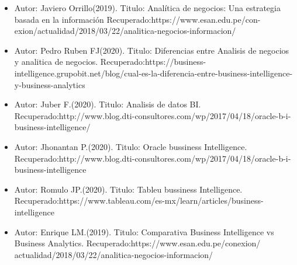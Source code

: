 \documentclass[twoside,twocolumn]{article}
\begin{document}
\begin{itemize}
\item Autor: Javiero Orrillo(2019).
\newline
\newline
Titulo: Analítica de negocios: Una estrategia basada en la información
\newline
\newline
Recuperado:https://www.esan.edu.pe/con-
exion/actualidad/2018/03/22/analitica-negocios-informacion/
\newline
\item Autor: Pedro Ruben FJ(2020).
\newline
\newline
Titulo: Diferencias entre Analisis de negocios y analitica de negocios.
\newline
\newline
Recuperado:https://business-intelligence.grupobit.net/blog/cual-es-la-diferencia-entre-business-intelligence-y-business-analytics


\item Autor: Juber F.(2020).
\newline
\newline
Titulo: Analisis de datos BI.
\newline
\newline
Recuperado:http://www.blog.dti-consultores.com/wp/2017/04/18/oracle-b-i-business-intelligence/

\item Autor: Jhonantan P.(2020).
\newline
\newline
Titulo: Oracle bussiness Intelligence.
\newline
\newline
Recuperado:http://www.blog.dti-consultores.com/wp/2017/04/18/oracle-b-i-business-intelligence

\item Autor: Romulo JP.(2020).
\newline
\newline
Titulo: Tableu bussiness Intelligence.
\newline
\newline
Recuperado:https://www.tableau.com/es-mx/learn/articles/business-intelligence


\item Autor: Enrique LM.(2019).
\newline
\newline
Titulo: Comparativa Business Intelligence vs Business Analytics.
\newline
\newline
Recuperado:https://www.esan.edu.pe/conexion/
actualidad/2018/03/22/analitica-negocios-informacion/



\end{itemize}
\end{document}
